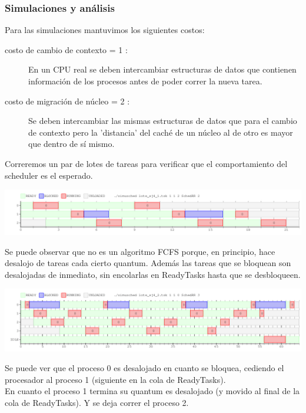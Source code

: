 \subsubsection{Simulaciones y análisis}

Para las simulaciones mantuvimos los siguientes costos:
\begin{description}
 \item[costo de cambio de contexto = 1 :]{En un CPU real se deben intercambiar estructuras de datos que contienen información de los procesos antes de poder correr la nueva tarea.}
 \item[costo de migración de núcleo = 2 :]{Se deben intercambiar las mismas estructuras de datos que para el cambio de contexto pero la 'distancia' del caché de un núcleo al de otro es mayor que dentro de sí mismo.}
\end{description}

Correremos un par de lotes de tareas para verificar que el comportamiento del scheduler es el esperado.

\begin{center}
 \includegraphics[scale=0.48]{./RR/RR_simple.png}
\end{center}

Se puede observar que no es un algoritmo FCFS porque, en principio, hace desalojo de tareas cada cierto quantum.
Además las tareas que se bloquean son desalojadas de inmediato, sin encolarlas en ReadyTasks hasta que se desbloqueen.

\begin{center}
 \includegraphics[scale=0.48]{./RR/RR_example_2.png}
\end{center}

Se puede ver que el proceso 0 es desalojado en cuanto se bloquea, cediendo el procesador al
proceso 1 (siguiente en la cola de ReadyTasks).\\
En cuanto el proceso 1 termina su quantum es desalojado (y movido al final de la cola de ReadyTasks).
Y se deja correr el proceso 2.\\

